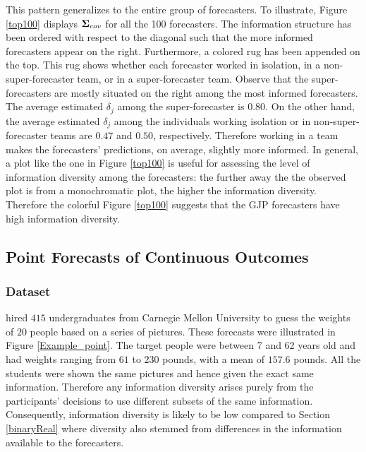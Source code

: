 \documentclass[11pt]{article}
\theoremstyle{definition}
\theoremstyle{definition}
\def\bSigma{{\bf \Sigma}}
\begin{document}
This pattern generalizes to the entire group of forecasters. To illustrate, Figure  \ref{top100} displays $\bSigma_{cov}$ for all the 100 forecasters. The information structure has been ordered with respect to the diagonal such that the more informed forecasters appear on the right. Furthermore, a colored rug has been appended on the top. This rug shows whether each forecaster worked in isolation, in a non-super-forecaster team, or in a super-forecaster team. Observe that the super-forecasters are mostly situated on the right among the most informed forecasters. The average estimated $\delta_j$ among the super-forecaster is $0.80$.  On the other hand, the average estimated $\delta_j$ among the individuals working isolation or in non-super-forecaster teams are $0.47$ and $0.50$, respectively. Therefore working in a team makes the forecasters' predictions, on average, slightly more informed. In general, a plot like the one in Figure  \ref{top100} is useful for assessing the level of information diversity among the forecasters: the further away the the observed plot is from a monochromatic plot, the higher the information diversity. Therefore the colorful Figure  \ref{top100} suggests that the GJP forecasters have high information diversity. 




\subsection{Point Forecasts of Continuous Outcomes}
\label{continuousReal}
\subsubsection{Dataset}
\citet{moore2008use} hired $415$ undergraduates from Carnegie Mellon University to guess the weights of $20$ people based on a series of pictures. These forecasts were illustrated in Figure \ref{Example_point}. The target people were between 7 and 62 years old and had weights ranging from $61$ to $230$ pounds, with a mean of $157.6$ pounds. All the students were shown the same pictures and hence given the exact same information. 
Therefore any information diversity arises purely from the participants' decisions to use different subsets of the same information. 
Consequently, information diversity is likely to be low compared to Section \ref{binaryReal} where diversity also stemmed from differences in the information available to the forecasters.
\end{document}
